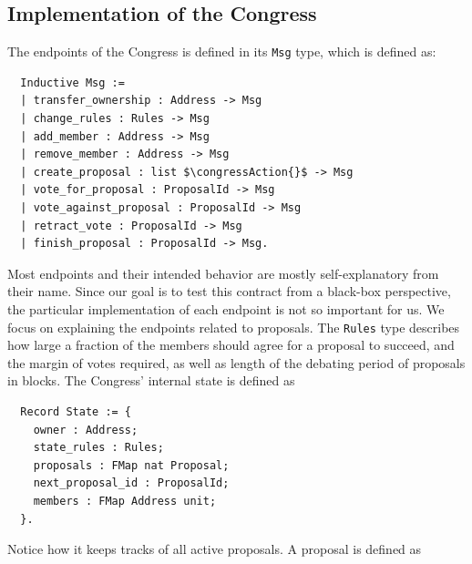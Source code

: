 \documentclass[twoside,11pt,openright]{report}
\newenvironment{code}{\captionsetup{type=figure, singlelinecheck=off, justification=raggedleft}}{}
\newcommand{\coq}[1]{\texttt{#1}}
\begin{document}
\subsection{Implementation of the Congress}
The endpoints of the Congress is defined in its \coq{Msg} type, which is defined as:
\newcommand{\createproposal}{\hyperref[def:congress-msg]{\coq{create\_proposal}}}
\newcommand{\votefor}{\hyperref[def:congress-msg]{\coq{vote\_for\_proposal}}}
\newcommand{\voteagainst}{\hyperref[def:congress-msg]{\coq{vote\_against\_proposal}}}
\newcommand{\retractvote}{\hyperref[def:congress-msg]{\coq{retract\_vote}}}
\newcommand{\finishproposal}{\hyperref[def:congress-msg]{\coq{finish\_proposal}}}
\newcommand{\congressAction}{\hyperref[def:CongressAction]{\coq{CongressAction}}}
\begin{code}
\label{def:congress-msg}
\begin{verbatim}
  Inductive Msg :=
  | transfer_ownership : Address -> Msg
  | change_rules : Rules -> Msg
  | add_member : Address -> Msg
  | remove_member : Address -> Msg
  | create_proposal : list $\congressAction{}$ -> Msg
  | vote_for_proposal : ProposalId -> Msg
  | vote_against_proposal : ProposalId -> Msg
  | retract_vote : ProposalId -> Msg
  | finish_proposal : ProposalId -> Msg.
\end{verbatim}
\end{code}
Most endpoints and their intended behavior are mostly self-explanatory from their name. Since our goal is to test this contract from a black-box perspective, the particular implementation of each endpoint is not so important for us. We focus on explaining the endpoints related to proposals. The \coq{Rules} type describes how large a fraction of the members should agree for a proposal to succeed, and the margin of votes required, as well as length of the debating period of proposals in blocks. The Congress' internal state is defined as
\begin{code}
\label{def:congress-state}
\begin{verbatim}
  Record State := {
    owner : Address;
    state_rules : Rules;
    proposals : FMap nat Proposal;
    next_proposal_id : ProposalId;
    members : FMap Address unit;
  }.
\end{verbatim}
\end{code}
Notice how it keeps tracks of all active proposals. A proposal is defined as
\end{document}
